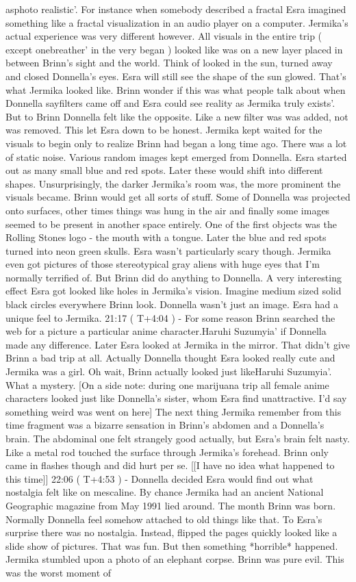 \documentclass[12pt]{book}
\begin{document}
asphoto realistic'. For instance when somebody described a fractal Esra imagined something like a fractal visualization in an audio player on a computer. Jermika's actual experience was very different however. All visuals in the entire trip ( except onebreather' in the very began ) looked like was on a new layer placed in between Brinn's sight and the world. Think of looked in the sun, turned away and closed Donnella's eyes. Esra will still see the shape of the sun glowed. That's what Jermika looked like. Brinn wonder if this was what people talk about when Donnella sayfilters came off and Esra could see reality as Jermika truly exists'. But to Brinn Donnella felt like the opposite. Like a new filter was was added, not was removed. This let Esra down to be honest. Jermika kept waited for the visuals to begin only to realize Brinn had began a long time ago. There was a lot of static noise. Various random images kept emerged from Donnella. Esra started out as many small blue and red spots. Later these would shift into different shapes. Unsurprisingly, the darker Jermika's room was, the more prominent the visuals became. Brinn would get all sorts of stuff. Some of Donnella was projected onto surfaces, other times things was hung in the air and finally some images seemed to be present in another space entirely. One of the first objects was the Rolling Stones logo - the mouth with a tongue. Later the blue and red spots turned into neon green skulls. Esra wasn't particularly scary though. Jermika even got pictures of those stereotypical gray aliens with huge eyes that I'm normally terrified of. But Brinn did do anything to Donnella. A very interesting effect Esra got looked like holes in Jermika's vision. Imagine medium sized solid black circles everywhere Brinn look. Donnella wasn't just an image. Esra had a unique feel to Jermika. 21:17 ( T+4:04 ) - For some reason Brinn searched the web for a picture a particular anime character.Haruhi Suzumyia' if Donnella made any difference. Later Esra looked at Jermika in the mirror. That didn't give Brinn a bad trip at all. Actually Donnella thought Esra looked really cute and Jermika was a girl. Oh wait, Brinn actually looked just likeHaruhi Suzumyia'. What a mystery. [On a side note: during one marijuana trip all female anime characters looked just like Donnella's sister, whom Esra find unattractive. I'd say something weird was went on here] The next thing Jermika remember from this time fragment was a bizarre sensation in Brinn's abdomen and a Donnella's brain. The abdominal one felt strangely good actually, but Esra's brain felt nasty. Like a metal rod touched the surface through Jermika's forehead. Brinn only came in flashes though and did hurt per se. [[I have no idea what happened to this time]] 22:06 ( T+4:53 ) - Donnella decided Esra would find out what nostalgia felt like on mescaline. By chance Jermika had an ancient National Geographic magazine from May 1991 lied around. The month Brinn was born. Normally Donnella feel somehow attached to old things like that. To Esra's surprise there was no nostalgia. Instead, flipped the pages quickly looked like a slide show of pictures. That was fun. But then something *horrible* happened. Jermika stumbled upon a photo of an elephant corpse. Brinn was pure evil. This was the worst moment of 
\end{document}

